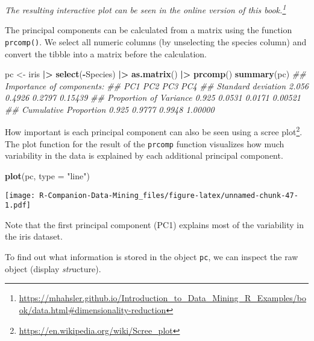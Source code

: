 \documentclass[
  notitlepage]{book}
\newenvironment{Shaded}{\begin{snugshade}}{\end{snugshade}}
\newcommand{\CommentTok}[1]{\textcolor[rgb]{0.56,0.35,0.01}{\textit{#1}}}
\newcommand{\DataTypeTok}[1]{\textcolor[rgb]{0.13,0.29,0.53}{#1}}
\newcommand{\ErrorTok}[1]{\textcolor[rgb]{0.64,0.00,0.00}{\textbf{#1}}}
\newcommand{\KeywordTok}[1]{\textcolor[rgb]{0.13,0.29,0.53}{\textbf{#1}}}
\newcommand{\NormalTok}[1]{#1}
\newcommand{\OperatorTok}[1]{\textcolor[rgb]{0.81,0.36,0.00}{\textbf{#1}}}
\newcommand{\StringTok}[1]{\textcolor[rgb]{0.31,0.60,0.02}{#1}}
\DeclareRobustCommand{\href}[2]{#2\footnote{\url{#1}}}
\begin{document}
\emph{The resulting interactive plot can be seen in the \href{https://mhahsler.github.io/Introduction_to_Data_Mining_R_Examples/book/data.html\#dimensionality-reduction}{online version of this book.}}

The principal components can be calculated from a matrix using the
function \texttt{prcomp()}. We select all numeric columns (by unselecting the
species column) and convert the tibble into a matrix before the
calculation.

\begin{Shaded}
\begin{Highlighting}[]
\NormalTok{pc \textless{}{-}}\StringTok{ }\NormalTok{iris }\OperatorTok{|}\ErrorTok{\textgreater{}}\StringTok{ }
\StringTok{  }\KeywordTok{select}\NormalTok{(}\OperatorTok{{-}}\NormalTok{Species) }\OperatorTok{|}\ErrorTok{\textgreater{}}\StringTok{ }
\StringTok{  }\KeywordTok{as.matrix}\NormalTok{() }\OperatorTok{|}\ErrorTok{\textgreater{}}\StringTok{ }
\StringTok{  }\KeywordTok{prcomp}\NormalTok{()}
\KeywordTok{summary}\NormalTok{(pc)}
\CommentTok{\#\# Importance of components:}
\CommentTok{\#\#                          PC1    PC2    PC3     PC4}
\CommentTok{\#\# Standard deviation     2.056 0.4926 0.2797 0.15439}
\CommentTok{\#\# Proportion of Variance 0.925 0.0531 0.0171 0.00521}
\CommentTok{\#\# Cumulative Proportion  0.925 0.9777 0.9948 1.00000}
\end{Highlighting}
\end{Shaded}

How important is each principal component can also be seen using a
\href{https://en.wikipedia.org/wiki/Scree_plot}{scree plot}. The plot
function for the result of the \texttt{prcomp} function visualizes how much
variability in the data is explained by each additional principal
component.

\begin{Shaded}
\begin{Highlighting}[]
\KeywordTok{plot}\NormalTok{(pc, }\DataTypeTok{type =} \StringTok{"line"}\NormalTok{)}
\end{Highlighting}
\end{Shaded}

\texttt{[image: R-Companion-Data-Mining\_files/figure-latex/unnamed-chunk-47-1.pdf]}

Note that the first principal component (PC1) explains most of the
variability in the iris dataset.

To find out what information is stored in the object \texttt{pc}, we can
inspect the raw object (display \emph{str}ucture).
\end{document}
